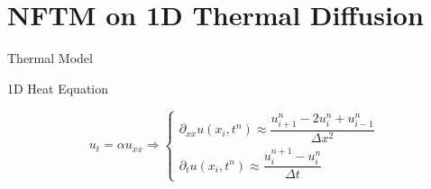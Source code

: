 \section{NFTM on 1D Thermal Diffusion}

\begin{secframe}
\small
\textcolor{red_unipd}{\Large Thermal Model}

\vspace{0.6em}

\begin{alertblock}{1D Heat Equation}

\begin{equation*}
   u_t = \alpha u_{xx} \Rightarrow
   \begin{cases}
      \partial_{xx} u(x_i,t^n) \approx \dfrac{u_{i+1}^n - 2u_i^n + u_{i-1}^n}{\Delta x^2} \\[1em]
      \partial_t u(x_i,t^n) \approx \dfrac{u_i^{n+1} - u_i^n}{\Delta t}
   \end{cases}
\end{equation*}


\end{alertblock}

\end{secframe}